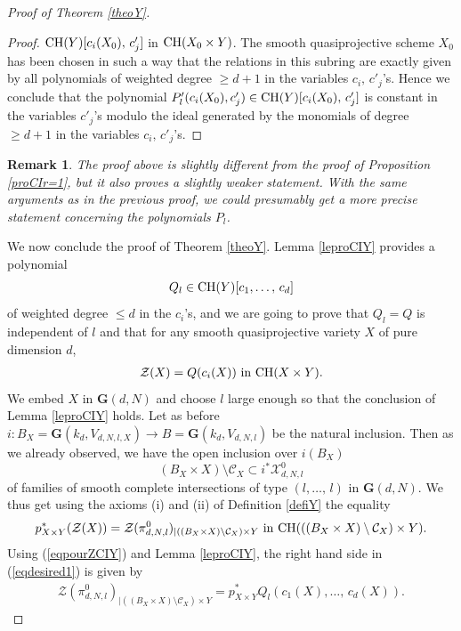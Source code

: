 \documentclass[10pt]{article}
\newtheorem{rema}[theo]{Remark}
\begin{document}
\begin{proof}[Proof of Theorem \ref{theoY}]
\begin{proof}
${\rm CH}(Y)[c_i(X_0),\,c'_j]$ in ${\rm CH}(X_0\times Y)$. The smooth quasiprojective scheme  $X_0$ has been chosen in such a way that
the relations in this subring are exactly given by all polynomials of weighted degree $\geq d+1$ in the variables
$c_i,\,c'_j$'s. Hence we conclude that the polynomial $P'_l(c_i(X_0),c'_j)\in {\rm CH}(Y)[c_i(X_0),\,c'_j]$ is constant in the variables  $c'_j$'s modulo the ideal generated by
the monomials of degree $\geq d+1$ in the variables  $c_i,\,c'_j$'s.
\end{proof}
\begin{rema}{\rm The proof above is slightly different from the proof of Proposition \ref{proCIr=1}, but it also proves a slightly weaker statement. With the same arguments as in the previous proof, we could presumably get a more precise statement concerning the polynomials
$P_l$.}
\end{rema}
We now conclude the proof of Theorem \ref{theoY}. Lemma \ref{leproCIY} provides a polynomial
$$Q_l\in{\rm CH}(Y)[c_1,\ldots,\,c_d]$$ of weighted degree $\leq d$ in the $c_i$'s, and we are going to prove that $Q_l=Q $ is independent of $l$ and that for any smooth quasiprojective variety $X$ of pure dimension $d$,
\begin{eqnarray}\label{eqdesired}
\mathcal{Z}(X)=Q(c_i(X))\,\,{\rm in}\,\,{\rm CH}(X\times Y).
\end{eqnarray}
We embed $X$ in $\mathbf{G}(d, N)$ and choose $l$ large enough so that the conclusion
of Lemma \ref{leproCIY} holds. Let as before
$i:B_X=\mathbf{G}(k_d,V_{d,N,l,X})\rightarrow B=\mathbf{G}(k_d,V_{d,N,l})$ be the natural inclusion. Then as we already observed, we  have the open inclusion over
$i(B_{X})$
$$ (B_X\times X)\setminus\mathcal{C}_X\subset i^*\mathcal{X}_{d,N,l}^0$$
of families of smooth complete intersections of type $(l,\ldots,\,l)$ in $\mathbf{G}(d,N)$.
We thus get using the axioms (i) and (ii) of Definition \ref{defiY}
 the equality
 \begin{eqnarray}\label{eqdesired1} p_{X\times Y}^*(\mathcal{Z}(X))=\mathcal{Z}(\pi_{d,N,l}^0)_{\mid  ((B_X\times X)\setminus\mathcal{C}_X)\times Y}\,\,
  {\rm in}\,\, {\rm CH}(((B_X\times X)\setminus\mathcal{C}_X)\times Y).
  \end{eqnarray}
Using (\ref{eqpourZCIY}) and  Lemma \ref{leproCIY},   the right hand side in (\ref{eqdesired1}) is given by
\begin{eqnarray}\label{eqdesired2}\mathcal{Z}(\pi_{d,N,l}^0)_{\mid  ((B_X\times X)\setminus\mathcal{C}_X)\times Y}=p_{X\times Y}^*Q_l(c_1(X),\ldots,\,c_d(X)).

\end{eqnarray}
\end{proof}
\end{document}
